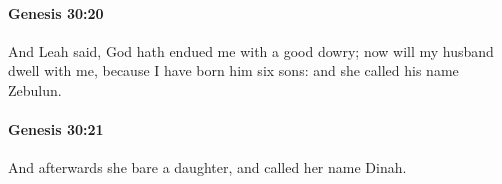 		\paragraph{Genesis 30:20} %
			\label{GENESIS-30-20}

			And Leah said, God hath endued me with a good dowry; now will my husband dwell with me, because I have born him six sons: and she called his name Zebulun.


		\paragraph{Genesis 30:21} %
			\label{GENESIS-30-21}

			And afterwards she bare a daughter, and called her name Dinah.



